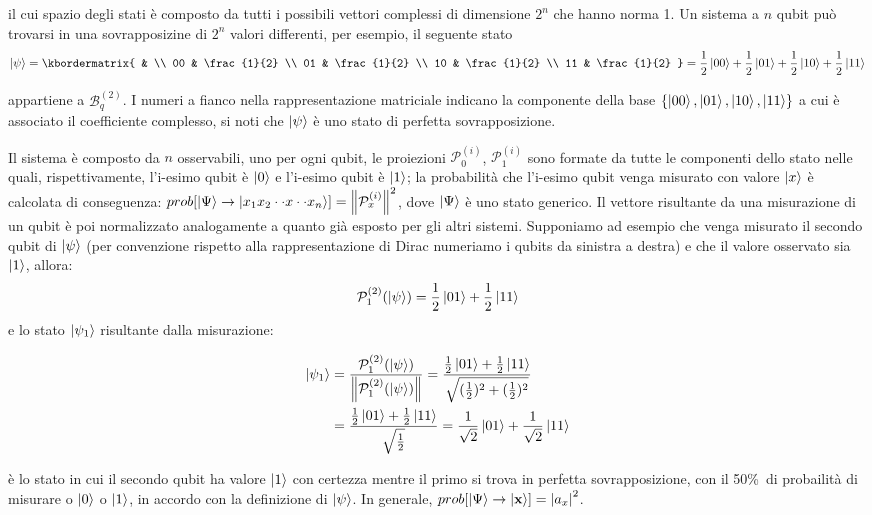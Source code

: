 \documentclass[12pt,a4paper,openright]{report}
\newcommand{\norm}[1]{\left\lVert#1\right\rVert}
\begin{document}
il cui spazio degli stati è composto da tutti i possibili vettori complessi di dimensione $2^n$ che hanno norma 1. Un sistema a $n$ qubit può trovarsi in una sovrapposizine di $2^n$ valori differenti, per esempio, il seguente stato  
\[
    \ket{\psi} = 
         \kbordermatrix{
              &    \\
          00 & \frac{1}{2} \\
          01 & \frac{1}{2} \\
          10 & \frac{1}{2} \\
          11 & \frac{1}{2}   
            } = \frac{1}{2}\ket{00} + \frac{1}{2}\ket{01} + \frac{1}{2}\ket{10} + \frac{1}{2}\ket{11}
\] 

appartiene a $\mathcal{B}_q^{(2)}$. I numeri a fianco nella rappresentazione matriciale indicano la componente della base $\{ \ket{00}, \ket{01}, \ket{10}, \ket{11} \}$ a cui è associato il coefficiente complesso,
si noti che $\ket{\psi}$ è uno stato di perfetta sovrapposizione.\par
Il sistema è composto da $n$ osservabili, uno per ogni qubit, le proiezioni ${\mathcal{P}^{(i)}_0}$, ${\mathcal{P}^{(i)}_1}$ sono formate da tutte le componenti dello stato nelle quali, rispettivamente, l'i-esimo qubit è $\ket0$
e l'i-esimo qubit è $\ket1$; la probabilità che l'i-esimo qubit venga misurato con valore $\ket{x}$ è calcolata di conseguenza:
$prob[\ket{\Psi} \rightarrow \ket{x_1 x_2 \cdot \cdot x \cdot \cdot x_n}]= \norm{{\mathcal{P}^{(i)}_x}}^2$, dove $\ket{\Psi}$ è uno stato generico. Il vettore risultante da una misurazione di un qubit è poi normalizzato analogamente a quanto già esposto per gli altri sistemi.
Supponiamo ad esempio che venga misurato il secondo qubit di $\ket{\psi}$ (per convenzione rispetto alla rappresentazione di Dirac numeriamo i qubits da sinistra a destra) e che il valore osservato sia $\ket1$, allora:
\[
    {\mathcal{P}^{(2)}_1}(\ket{\psi}) = \frac{1}{2}\ket{01} + \frac{1}{2}\ket{11}  
\]
e lo stato $\ket{\psi_1}$ risultante dalla misurazione:
\begin{center}
    \begin{align*}
        \ket{\psi_1} &= \frac{{\mathcal{P}^{(2)}_1}(\ket{\psi}) }{ \norm{{\mathcal{P}^{(2)}_1}(\ket{\psi})} } = \frac{\frac{1}{2}\ket{01} + \frac{1}{2}\ket{11}}{\sqrt{(\frac{1}{2})^2 + (\frac{1}{2})^2}}\\
        &= \frac{\frac{1}{2}\ket{01} + \frac{1}{2}\ket{11}}{\sqrt{\frac{1}{2}}} = \frac{1}{\sqrt2}\ket{01} + \frac{1}{\sqrt2}\ket{11}
    \end{align*}
\end{center}
è lo stato in cui il secondo qubit ha valore $\ket1$ con certezza mentre il primo si trova in perfetta sovrapposizione, con il 50\%\ di probailità di misurare o $\ket0$ o $\ket1$, in accordo con la definizione
di $\ket{\psi}$. In generale, $prob[\ket{\Psi} \rightarrow \ket{\textbf{x}}] ={\left\vert{a_x}\right\vert}^2$.\par
\end{document}
